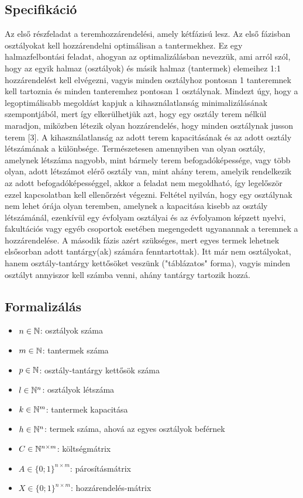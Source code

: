 \documentclass[12pt,a4paper]{report}
\begin{document}
\subsection{Specifikáció}

Az első részfeladat a teremhozzárendelési, amely kétfázisú lesz. Az első fázisban osztályokat kell hozzárendelni optimálisan a tantermekhez. Ez egy halmazfelbontási feladat, ahogyan az optimalizálásban nevezzük, ami arról szól, hogy az egyik halmaz (osztályok) és másik halmaz (tantermek) elemeihez 1:1 hozzárendelést kell elvégezni, vagyis minden osztályhoz pontosan
1 tanteremnek kell tartoznia és minden tanteremhez pontosan 1 osztálynak. Mindezt úgy, hogy a legoptimálisabb megoldást kapjuk a kihasználatlanság minimalizálásának szempontjából, mert így elkerülhetjük azt, hogy egy osztály terem nélkül maradjon, miközben létezik olyan hozzárendelés, hogy minden osztálynak jusson terem [3]. A kihasználatlanság az adott terem kapacitásának és az adott osztály létszámának a különbsége. Természetesen amennyiben van olyan osztály, amelynek létszáma nagyobb, mint bármely terem befogadóképessége, vagy több olyan, adott létszámot elérő osztály van, mint ahány terem, amelyik rendelkezik az adott befogadóképességgel, akkor a feladat nem megoldható, így legelőször ezzel kapcsolatban kell ellenőrzést végezni. Feltétel nyilván, hogy egy osztálynak nem lehet órája olyan teremben, amelynek a kapacitása kisebb az osztály létszámánál, ezenkívül egy évfolyam osztályai és az évfolyamon képzett nyelvi, fakultációs vagy egyéb csoportok esetében megengedett ugyanannak a teremnek a hozzárendelése. A második
fázis azért szükséges, mert egyes termek lehetnek elsősorban adott tantárgy(ak) számára fenntartottak). Itt már nem osztályokat, hanem osztály-tantárgy kettősöket veszünk ("táblázatos" forma), vagyis minden osztályt annyiszor kell számba venni, ahány tantárgy tartozik hozzá. 

\subsection{Formalizálás}

\begin{itemize}
    \item $n \in \Bbb{N}$: osztályok száma
    \item $m \in \Bbb{N}$: tantermek száma
    \item $p \in \Bbb{N}$: osztály-tantárgy kettősök száma
    \item $l \in \Bbb{N}^n$: osztályok létszáma
    \item $k \in \Bbb{N}^m$: tantermek kapacitása
    \item $h \in \Bbb{N}^n$: termek száma, ahová az egyes osztályok beférnek
    \item $C \in \Bbb{N}^{n \times m}$: költségmátrix
    \item $A \in \{0;1\}^{n \times m}$: párosításmátrix
    \item $X \in \{0;1\}^{n \times m}$: hozzárendelés-mátrix
\end{itemize}
\end{document}
